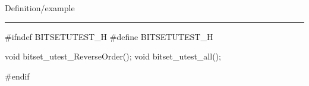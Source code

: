 
Definition/example

\bigskip
\hrule
\code
#ifndef BITSETUTEST_H
#define BITSETUTEST_H
\endcode

\code

void bitset_utest_ReverseOrder();
void bitset_utest_all();

#endif
\endcode

